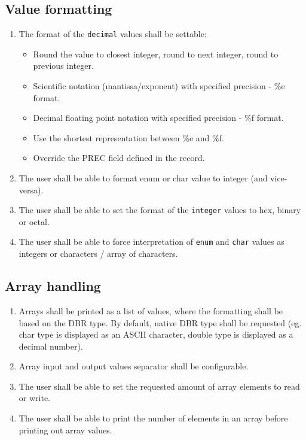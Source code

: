 \documentclass[12pt,a4paper]{article}
\begin{document}
\subsection{Value formatting}
\begin{enumerate}
	\item The format of the \texttt{decimal} values shall be settable:
	\begin{itemize}
		\item Round the value to closest integer, round to next integer, round to previous integer.
		\item Scientific notation (mantissa/exponent) with specified precision - \%e format.
		\item Decimal floating point notation with specified precision - \%f format.
		\item Use the shortest representation between \%e and \%f.
		\item Override the PREC field defined in the record.
	\end{itemize}
	\item The user shall be able to format enum or char value to integer (and vice-versa).
	\item The user shall be able to set the format of the \texttt{integer} values to hex, binary or octal.
	\item The user shall be able to force interpretation of \texttt{enum} and \texttt{char} values as integers or characters / array of characters.
\end{enumerate}

\subsection{Array handling}
\begin{enumerate}
	\item Arrays shall be printed as a list of values, where the formatting shall be based on the DBR type. By default, native DBR type shall be requested (eg. char type is displayed as an ASCII character, double type is displayed as a decimal number).
	\item Array input and output values separator shall be configurable.
	\item The user shall be able to set the requested amount of array elements to read or write.
	\item The user shall be able to print the number of elements in an array before printing out array values.
\end{enumerate}
\end{document}
